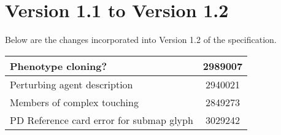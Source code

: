 \section{Version 1.1 to Version 1.2}

Below are the changes incorporated into Version 1.2 of the \SBGNPDLone specification.

\begin{center}
\label{tab:revision history}
\tablelasttail{\hline}
\begin{supertabular}{|p{12cm}|c|}\hline
Phenotype cloning? & 2989007 \\\hline
Perturbing agent description & 2940021 \\\hline
Members of complex touching & 2849273 \\\hline
PD Reference card error for submap glyph & 3029242 \\\hline
\end{supertabular}
\end{center}
